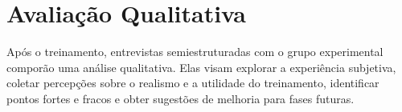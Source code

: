 \section{Avaliação Qualitativa}

Após o treinamento, entrevistas semiestruturadas com o grupo experimental comporão uma análise qualitativa. Elas visam explorar a experiência subjetiva, coletar percepções sobre o realismo e a utilidade do treinamento, identificar pontos fortes e fracos e obter sugestões de melhoria para fases futuras.
